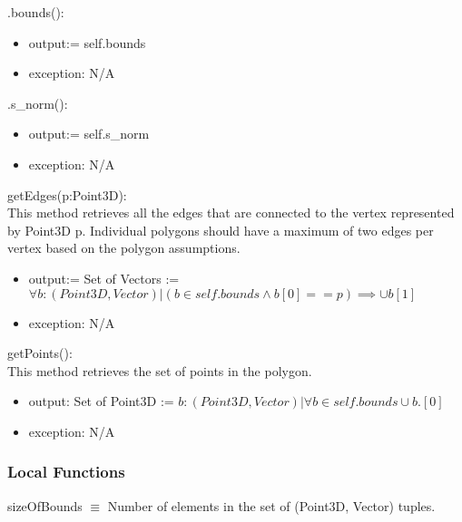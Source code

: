 \documentclass[12pt, titlepage]{article}
\begin{document}
\noindent .bounds():
\begin{itemize}
	\item output:= self.bounds
	\item exception: N/A
\end{itemize}

\noindent .s\_norm():
\begin{itemize}
	\item output:= self.s\_norm
	\item exception: N/A
\end{itemize}

\noindent getEdges(p:Point3D):\\
This method retrieves all the edges that are connected to the vertex 
represented by Point3D p. Individual polygons should have a maximum of two 
edges per vertex based on the polygon assumptions.\\
\begin{itemize}
	\item output:= Set of Vectors := $\forall b : (Point3D,Vector) | (b \in 
	self.bounds \wedge b[0] == p) \implies \cup b[1] $
	\item exception: N/A
\end{itemize}

\noindent getPoints():\\
This method retrieves the set of points in the polygon.\\
\begin{itemize}
	\item output: Set of Point3D := $b: (Point3D, Vector)| \forall b \in 
	self.bounds  \cup b.[0]$
	\item exception: N/A
\end{itemize}


\subsubsection{Local Functions}
sizeOfBounds $\equiv$ Number of elements in the set of (Point3D, Vector) 
tuples.\\


\newpage

\end{document}
